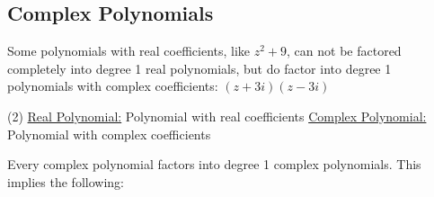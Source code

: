\documentclass[11pt, openright]{book}
\begin{document}
\begin{figure}[ht]
    \begin{floatrow}


    \end{floatrow}
\end{figure}

\subsection{Complex Polynomials}

Some polynomials with real coefficients, like $z^2+9$, can not be factored completely into degree 1 real polynomials, but do factor into degree 1 polynomials with complex coefficients: $(z+3i)(z-3i)$

\begin{tasks}(2)
    \task[] \hspace{-9mm}\uline{Real Polynomial:}\hspace{2mm} Polynomial with real coefficients
    \task[] \hspace{-12mm}\uline{Complex Polynomial:}\hspace{2mm} Polynomial with complex coefficients
\end{tasks}
\vspace{-10pt}

Every complex polynomial factors into degree 1 complex polynomials. This implies the following:\vspace{-7pt}
\end{document}
